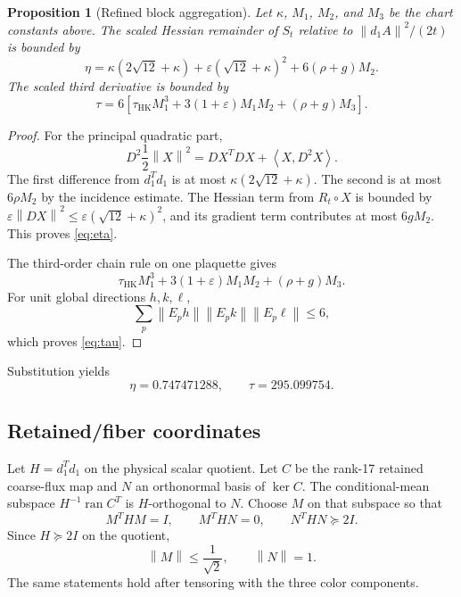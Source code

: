 \documentclass[11pt]{article}
\newtheorem{proposition}[theorem]{Proposition}
\theoremstyle{definition}
\newcommand{\norm}[1]{\left\lVert #1\right\rVert}
\newcommand{\ip}[2]{\left\langle #1,#2\right\rangle}
\begin{document}
\begin{proposition}[Refined block aggregation]\label{prop:action}
Let $\kappa$, $M_1$, $M_2$, and $M_3$ be the chart constants above.  The
scaled Hessian remainder of $S_t$ relative to
$\norm{d_1A}^2/(2t)$ is bounded by
\begin{equation}\label{eq:eta}
 \eta=
 \kappa(2\sqrt{12}+\kappa)
 +\varepsilon(\sqrt{12}+\kappa)^2
 +6(\rho+g)M_2.
\end{equation}
The scaled third derivative is bounded by
\begin{equation}\label{eq:tau}
 \tau=6\left[
 \tau_{\mathrm{HK}}M_1^3
 +3(1+\varepsilon)M_1M_2
 +(\rho+g)M_3
 \right].
\end{equation}
\end{proposition}

\begin{proof}
For the principal quadratic part,
\[
 D^2\frac12\norm X^2=DX^TDX+\ip{X}{D^2X}.
\]
The first difference from $d_1^Td_1$ is at most
$\kappa(2\sqrt{12}+\kappa)$.  The second is at most $6\rho M_2$ by the
incidence estimate.  The Hessian term from $R_t\circ X$ is bounded by
$\varepsilon\norm{DX}^2\le\varepsilon(\sqrt{12}+\kappa)^2$, and its gradient
term contributes at most $6gM_2$.  This proves \eqref{eq:eta}.

The third-order chain rule on one plaquette gives
\[
 \tau_{\mathrm{HK}}M_1^3+3(1+\varepsilon)M_1M_2
 +(\rho+g)M_3.
\]
For unit global directions $h,k,\ell$,
\[
 \sum_p\norm{E_ph}\norm{E_pk}\norm{E_p\ell}\le6,
\]
which proves \eqref{eq:tau}.
\end{proof}

Substitution yields
\[
 \eta=0.747471288,\qquad \tau=295.099754.
\]

\subsection{Retained/fiber coordinates}

Let $H=d_1^Td_1$ on the physical scalar quotient.  Let $C$ be the rank-17
retained coarse-flux map and $N$ an orthonormal basis of $\ker C$.  The
conditional-mean subspace $H^{-1}\operatorname{ran}C^T$ is $H$-orthogonal to
$N$.  Choose $M$ on that subspace so that
\begin{equation}\label{eq:whiten}
 M^THM=I,\qquad M^THN=0,\qquad N^THN\succeq2I.
\end{equation}
Since $H\succeq2I$ on the quotient,
\begin{equation}\label{eq:Mbound}
 \norm M\le\frac1{\sqrt2},\qquad \norm N=1.
\end{equation}
The same statements hold after tensoring with the three color components.
\end{document}
